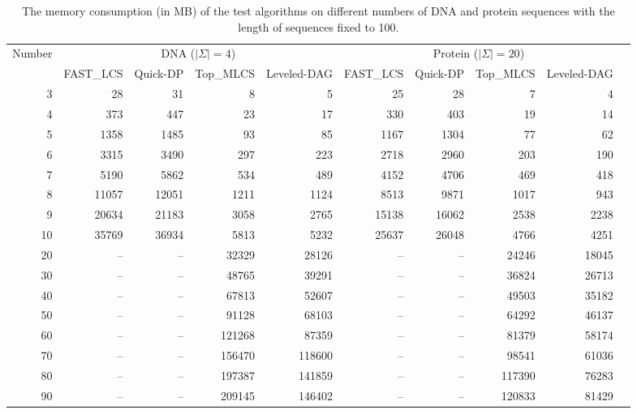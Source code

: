 \documentclass[utf8]{frontiersSCNS} %
\begin{document}
\begin{table*}[htp]
  \footnotesize
  \caption{The memory consumption (in MB) of the test algorithms on
    different numbers of DNA and protein sequences with the length of
    sequences fixed to 100.}
  \label{tab:memory1}
 \begin{tabular}{|r|r|r|r|r|r|r|r|r|r|}
   \hline
   Number &
   \multicolumn{4}{c|}{DNA ($|\Sigma|=4$)} & \multicolumn{4}{c|}{Protein ($|\Sigma|=20$)}\\
   \cline{2-9}
     & FAST\_LCS & Quick-DP & Top\_MLCS & Leveled-DAG & FAST\_LCS & Quick-DP & Top\_MLCS & Leveled-DAG \\
   \hline
   3  & 28      & 31      &  8        & 5      & 25     & 28    & 7      & 4   \\
   4  & 373     & 447     &  23       & 17     & 330    & 403   & 19     & 14  \\
   5  & 1358    & 1485    &  93       & 85     & 1167   & 1304  & 77     & 62  \\
   6  & 3315    & 3490    &  297      & 223    & 2718   & 2960  & 203    & 190 \\
   7  & 5190    & 5862    &  534      & 489    & 4152   & 4706  & 469    & 418 \\
   8  & 11057   & 12051   &  1211     & 1124   & 8513   & 9871  & 1017   & 943 \\
   9  & 20634   & 21183   &  3058     & 2765   & 15138  & 16062 & 2538   & 2238\\

   10 & 35769   & 36934   &  5813     & 5232   & 25637  & 26048 & 4766   & 4251  \\
   20 & --      & --      &  32329    & 28126  &  --    &  --   & 24246  & 18045 \\
   30 & --      & --      &  48765    & 39291  &  --    &  --   & 36824  & 26713  \\
   40 & --      & --      &  67813    & 52607  &  --    &  --   & 49503  & 35182  \\
   50 & --      & --      &  91128    & 68103  &  --    &  --   & 64292  & 46137  \\
   60 & --      & --      &  121268   & 87359  &  --    &  --   & 81379  & 58174  \\
   70 & --      & --      &  156470   & 118600 &  --    &  --   & 98541  & 61036  \\
   80 & --      & --      &  197387   & 141859 &  --    &  --   & 117390 & 76283  \\
   90 & --      & --      &  209145   & 146402 &  --    &  --   & 120833 & 81429  \\



\end{tabular}
\end{table*}
\end{document}
